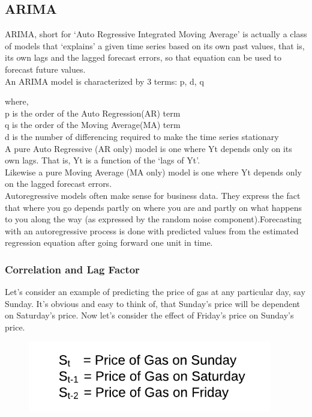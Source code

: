 \documentclass[12pt]{report}
\begin{document}
\subsection{ARIMA}


ARIMA, short for ‘Auto Regressive Integrated Moving Average’ is actually a class of models that ‘explains’ a given time series based on its own past values, that is, its own lags and the lagged forecast errors, so that equation can be used to forecast future values.\\

An ARIMA model is characterized by 3 terms: p, d, q

where,\\

p is the order of the Auto Regression(AR) term\\

q is the order of the Moving Average(MA) term\\

d is the number of differencing required to make the time series stationary\\


A pure Auto Regressive (AR only) model is one where Yt depends only on its own lags. That is, Yt is a function of the ‘lags of Yt’.\\

Likewise a pure Moving Average (MA only) model is one where Yt depends only on the lagged forecast errors.\\

Autoregressive models often make sense for business data. They express the fact that where you go depends partly on where you are and partly on what happens to you along the way (as expressed by the random noise component).Forecasting with an autoregressive process is done with predicted values from the estimated regression equation after going forward one unit in time.

\subsubsection{Correlation and Lag Factor}
Let’s consider an example of predicting the price of gas at any particular day, say Sunday. It’s obvious and easy to think of, that Sunday’s price will be dependent on Saturday’s price.
Now let’s consider the effect of Friday’s price on Sunday’s price.

\begin{figure}[H]%
  \begin {center}
  \includegraphics[width=0.95\textwidth]{images/prices.png}
  
  \label{fig:ecg}
  \end {center}
\end{figure}
\end{document}
